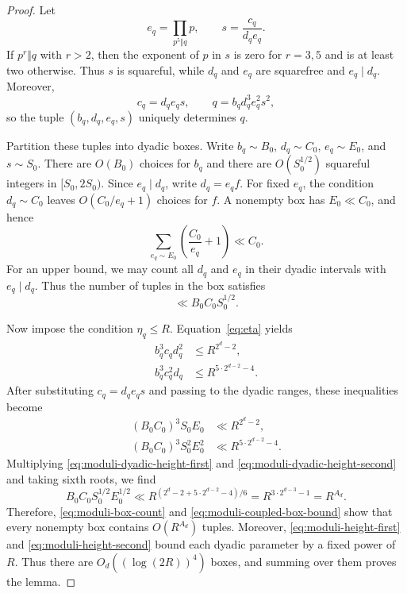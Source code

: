 \documentclass[reqno,a4paper,11pt]{amsart}
\numberwithin{equation}{section}
\theoremstyle{plain}
\theoremstyle{definition}
\begin{document}
\begin{proof}
Let
\[
 e_q=\prod_{p^5\Vert q}p,
 \qquad
 s=\frac{c_q}{d_qe_q}.
\]
If \(p^r\Vert q\) with \(r>2\), then the exponent of \(p\) in \(s\) is zero for \(r=3,5\) and is at least two otherwise.
Thus \(s\) is squareful, while \(d_q\) and \(e_q\) are squarefree and \(e_q\mid d_q\).
Moreover,
\[
 c_q=d_qe_qs,
 \qquad
 q=b_qd_q^3e_q^2s^2,
\]
so the tuple \((b_q,d_q,e_q,s)\) uniquely determines \(q\).

Partition these tuples into dyadic boxes.
Write \(b_q\sim B_0\), \(d_q\sim C_0\), \(e_q\sim E_0\), and \(s\sim S_0\).
There are \(O(B_0)\) choices for \(b_q\) and there are \(O(S_0^{1/2})\) squareful integers in \([S_0,2S_0)\).
Since \(e_q\mid d_q\), write \(d_q=e_qf\).
For fixed \(e_q\), the condition \(d_q\sim C_0\) leaves \(O(C_0/e_q+1)\) choices for \(f\).
A nonempty box has \(E_0\ll C_0\), and hence
\[
 \sum_{e_q\sim E_0}
 \left(\frac{C_0}{e_q}+1\right)
 \ll C_0.
\]
For an upper bound, we may count all \(d_q\) and \(e_q\) in their dyadic intervals with \(e_q\mid d_q\).
Thus the number of tuples in the box satisfies
\begin{equation}\label{eq:moduli-box-count}
 \ll B_0C_0S_0^{1/2}.
\end{equation}

Now impose the condition \(\eta_q\leq R\).
Equation~\eqref{eq:eta} yields
\begin{align}
 b_q^3c_qd_q^2
 &\leq R^{2^d-2},
 \label{eq:moduli-height-first}\\
 b_q^3c_q^2d_q
 &\leq R^{5\cdot2^{d-2}-4}.
 \label{eq:moduli-height-second}
\end{align}
After substituting \(c_q=d_qe_qs\) and passing to the dyadic ranges, these inequalities become
\begin{align}
 (B_0C_0)^3S_0E_0
 &\ll R^{2^d-2},
 \label{eq:moduli-dyadic-height-first}\\
 (B_0C_0)^3S_0^2E_0^2
 &\ll R^{5\cdot2^{d-2}-4}.
 \label{eq:moduli-dyadic-height-second}
\end{align}
Multiplying \eqref{eq:moduli-dyadic-height-first} and \eqref{eq:moduli-dyadic-height-second} and taking sixth roots, we find
\begin{equation}\label{eq:moduli-coupled-box-bound}
 B_0C_0S_0^{1/2}E_0^{1/2}
 \ll R^{(2^d-2+5\cdot2^{d-2}-4)/6}
 =R^{3\cdot2^{d-3}-1}
 =R^{A_d}.
\end{equation}
Therefore, \eqref{eq:moduli-box-count} and \eqref{eq:moduli-coupled-box-bound} show that every nonempty box contains \(O(R^{A_d})\) tuples.
Moreover, \eqref{eq:moduli-height-first} and \eqref{eq:moduli-height-second} bound each dyadic parameter by a fixed power of \(R\).
Thus there are \(O_d((\log(2R))^4)\) boxes, and summing over them proves the lemma.
\end{proof}
\end{document}
